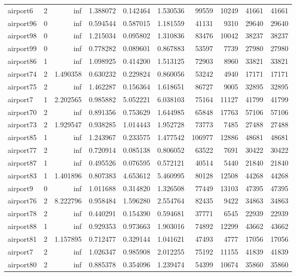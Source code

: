 \begin{longtable}{|l|r|r|r|r|r|r|r|r|r|}
airport6 & 2 & inf & 1.388072 & 0.142464 & 1.530536 & 99559 & 10249 & 41661 & 41661 \\
airport96 & 0 & inf & 0.594544 & 0.587015 & 1.181559 & 41131 & 9310 & 29640 & 29640 \\
airport98 & 0 & inf & 1.215034 & 0.095802 & 1.310836 & 83476 & 10042 & 38237 & 38237 \\
airport99 & 0 & inf & 0.778282 & 0.089601 & 0.867883 & 53597 & 7739 & 27980 & 27980 \\
airport86 & 1 & inf & 1.098925 & 0.414200 & 1.513125 & 72903 & 8960 & 33821 & 33821 \\
airport74 & 2 & 1.490358 & 0.630232 & 0.229824 & 0.860056 & 53242 & 4940 & 17171 & 17171 \\
airport75 & 2 & inf & 1.462287 & 0.156364 & 1.618651 & 86727 & 9005 & 32895 & 32895 \\
airport7 & 1 & 2.202565 & 0.985882 & 5.052221 & 6.038103 & 75164 & 11127 & 41799 & 41799 \\
airport70 & 2 & inf & 0.891356 & 0.753629 & 1.644985 & 65848 & 17763 & 57106 & 57106 \\
airport73 & 2 & 1.929547 & 0.938285 & 1.014443 & 1.952728 & 73773 & 7485 & 27488 & 27488 \\
airport85 & 1 & inf & 1.243967 & 0.233575 & 1.477542 & 106977 & 12886 & 48681 & 48681 \\
airport77 & 2 & inf & 0.720914 & 0.085138 & 0.806052 & 63522 & 7691 & 30422 & 30422 \\
airport87 & 1 & inf & 0.495526 & 0.076595 & 0.572121 & 40514 & 5440 & 21840 & 21840 \\
airport83 & 1 & 1.401896 & 0.807383 & 4.653612 & 5.460995 & 80128 & 12508 & 44268 & 44268 \\
airport9 & 0 & inf & 1.011688 & 0.314820 & 1.326508 & 77449 & 13103 & 47395 & 47395 \\
airport76 & 2 & 8.222796 & 0.958484 & 1.596280 & 2.554764 & 82435 & 9422 & 34863 & 34863 \\
airport78 & 2 & inf & 0.440291 & 0.154390 & 0.594681 & 37771 & 6545 & 22939 & 22939 \\
airport88 & 1 & inf & 0.929353 & 0.973663 & 1.903016 & 74892 & 12299 & 43662 & 43662 \\
airport81 & 2 & 1.157895 & 0.712477 & 0.329144 & 1.041621 & 47493 & 4777 & 17056 & 17056 \\
airport7 & 2 & inf & 1.026347 & 0.985908 & 2.012255 & 75192 & 11155 & 41839 & 41839 \\
airport80 & 2 & inf & 0.885378 & 0.354096 & 1.239474 & 54399 & 10674 & 35860 & 35860 \\

\end{longtable}

